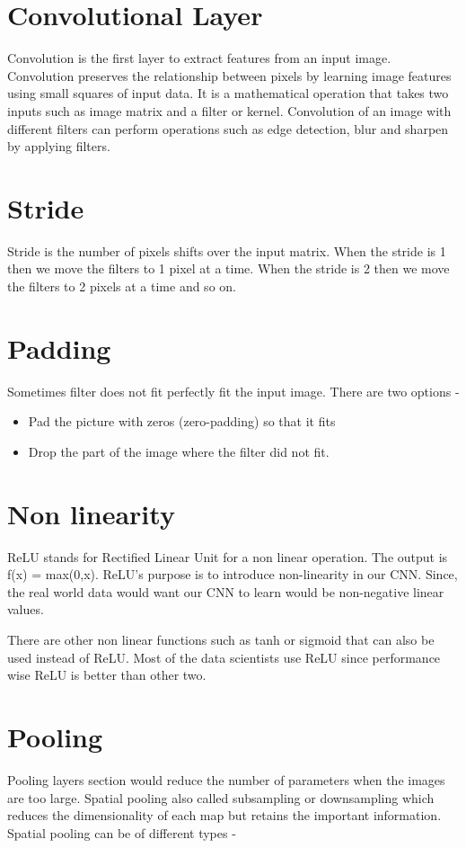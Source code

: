 \documentclass[a4paper,12pt]{report}
\begin{document}
\section{Convolutional Layer}
Convolution is the first layer to extract features from an input image. Convolution preserves the relationship between pixels by learning image features using small squares of input data. It is a mathematical operation that takes two inputs such as image matrix and a filter or kernel. Convolution of an image with different filters can perform operations such as edge detection, blur and sharpen by applying filters.

\section{Stride}
Stride is the number of pixels shifts over the input matrix. When the stride is 1 then we move the filters to 1 pixel at a time. When the stride is 2 then we move the filters to 2 pixels at a time and so on. %

\section{Padding}
Sometimes filter does not fit perfectly fit the input image. There are two options - 
\begin{itemize}
	\item Pad the picture with zeros (zero-padding) so that it fits
	\item Drop the part of the image where the filter did not fit.
\end{itemize}
    
\section{Non linearity}
ReLU stands for Rectified Linear Unit for a non linear operation. The output is f(x) = max(0,x). ReLU’s purpose is to introduce non-linearity in our CNN. Since, the real world data would want our CNN to learn would be non-negative linear values.

There are other non linear functions such as tanh or sigmoid that can also be used instead of ReLU. Most of the data scientists use ReLU since performance wise ReLU is better than other two.

\section{Pooling}
Pooling layers section would reduce the number of parameters when the images are too large. Spatial pooling also called subsampling or downsampling which reduces the dimensionality of each map but retains the important information. Spatial pooling can be of different types - 
\end{document}
